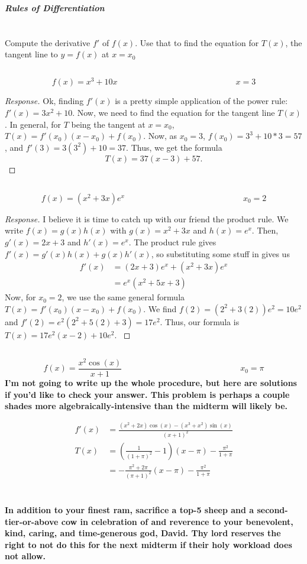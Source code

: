 \documentclass[english]{article}
\newcommand{\prob}[1]{\setcounter{section}{#1-1}\section{}}
\newcommand{\prt}[1]{\setcounter{subsection}{#1-1}\subsection{}}
\theoremstyle{remark}
\theoremstyle{definition}
\newcommand{\resp}[1]{\begin{proof}[Response]{#1}\end{proof}}
\begin{document}
		\begin{center}{\LARGE\textbf{\emph{Rules of Differentiation}}}\end{center}
\prob{7} Compute the derivative $f'$ of $f(x)$. Use that to find the equation for $T(x)$, the tangent line to $y=f(x)$ at $x=x_0$
\prt{1} $$f(x)=x^3+10x\hspace{6cm} x=3$$\resp{Ok, finding $f'(x)$ is a pretty simple application of the power rule: $f'(x)=3x^2+10$. Now, we need to find the equation for the tangent line $T(x)$. In general, for $T$ being the tangent at $x=x_0$, $T(x)=f'(x_0)(x-x_0)+f(x_0)$. Now, as $x_0=3$, $f(x_0)=3^3+10*3=57$, and $f'(3)=3(3^2)+10=37$. Thus, we get the formula $$T(x)=37(x-3)+57.$$}
\prt{2} $$f(x)=(x^2+3x)e^x\hspace{6cm}x_0=2$$\resp{
I believe it is time to catch up with our friend the product rule. We write $f(x)=g(x)h(x)$ with $g(x)=x^2+3x$ and $h(x)=e^x$. Then, $g'(x)=2x+3$ and $h'(x)=e^x$. The product rule gives $f'(x)=g'(x)h(x)+g(x)h'(x)$, so substituting some stuff in gives us \begin{align*}f'(x)&=(2x+3)e^x+(x^2+3x)e^x\\&=e^x(x^2+5x+3)
\end{align*} 
Now, for $x_0=2$, we use the same general formula  $T(x)=f'(x_0)(x-x_0)+f(x_0)$. We find $f(2)=(2^2+3(2))e^2=10e^2$ and $f'(2)=e^2(2^2+5(2)+3)=17e^2$. Thus, our formula is $T(x)=17e^2(x-2)+10e^2$.
}
\prt{3} $$f(x)=\frac{x^2\cos(x)}{x+1}\hspace{6cm}x_0=\pi$$
\textbf{I'm not going to write up the whole procedure, but here are solutions if you'd like to check your answer. This problem is perhaps a couple shades more algebraically-intensive than the midterm will likely be.}

\begin{align}
	f'(x)&=\frac{(x^2+2x) \cos (x)- (x^3+x^2) \sin (x)}{(x+1)^2}\\
	T(x)&=\left(\frac{1}{(1+\pi )^2}-1\right)(x-\pi)-\frac{\pi^2}{1+\pi}\\
	&=-\frac{\pi^2+2\pi}{(\pi+1)^2}(x-\pi)-\frac{\pi^2}{1+\pi}\end{align}

\prob{8}\textbf{\large In addition to your finest ram, sacrifice a top-5 sheep and a second-tier-or-above cow in celebration of and reverence to your benevolent, kind, caring, and time-generous god, David. Thy lord reserves the right to not do this for the next midterm if their holy workload does not allow.}
\end{document}
